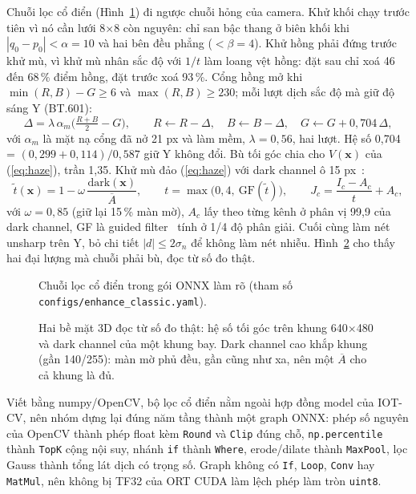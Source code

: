 Chuỗi lọc cổ điển (Hình~\ref{fig:classic}) đi ngược chuỗi hỏng của camera. Khử khối chạy trước tiên vì nó cần lưới 8$\times$8 còn nguyên: chỉ san bậc thang ở biên khối khi $|q_0-p_0|<\alpha=10$ và hai bên đều phẳng ($<\beta=4$). Khử hồng phải đứng trước khử mù, vì khử mù nhân sắc độ với $1/t$ làm loang vệt hồng: đặt sau chỉ xoá 46 đến 68\,\% điểm hồng, đặt trước xoá 93\,\%. Cổng hồng mở khi $\min(R,B)-G\geq6$ và $\max(R,B)\geq230$; mỗi lượt dịch sắc độ mà giữ độ sáng Y (BT.601):
\begin{equation}
\Delta=\lambda\,\alpha_m\Big(\tfrac{R+B}{2}-G\Big),\qquad R\leftarrow R-\Delta,\quad B\leftarrow B-\Delta,\quad G\leftarrow G+0{,}704\,\Delta,
\label{eq:magenta}
\end{equation}
với $\alpha_m$ là mặt nạ cổng đã nở 21 px và làm mềm, $\lambda=0{,}56$, hai lượt. Hệ số 0,704 = $(0{,}299+0{,}114)/0{,}587$ giữ Y không đổi. Bù tối góc chia cho $V(\mathbf{x})$ của (\ref{eq:haze}), trần 1,35. Khử mù đảo (\ref{eq:haze}) với dark channel ô 15 px~\cite{he-dcp}:
\begin{equation}
\tilde t(\mathbf{x}) = 1-\omega\,\frac{\mathrm{dark}(\mathbf{x})}{\overline{A}},\qquad t=\max\big(0{,}4,\ \mathrm{GF}(\tilde t)\big),\qquad J_c=\frac{I_c-A_c}{t}+A_c,
\label{eq:dehaze}
\end{equation}
với $\omega=0{,}85$ (giữ lại 15\,\% màn mờ), $A_c$ lấy theo từng kênh ở phân vị 99,9 của dark channel, GF là guided filter~\cite{guided} tính ở 1/4 độ phân giải. Cuối cùng làm nét unsharp trên Y, bỏ chi tiết $|d|\leq2\sigma_n$ để không làm nét nhiễu. Hình~\ref{fig:surf3d} cho thấy hai đại lượng mà chuỗi phải bù, đọc từ số đo thật.

\begin{figure}[!htbp]
\centering

\caption[Chuỗi lọc cổ điển trong gói ONNX làm rõ]{Chuỗi lọc cổ điển trong gói ONNX làm rõ (tham số \texttt{configs/enhance\_classic.yaml}).}
\label{fig:classic}
\end{figure}

\begin{figure}[!htbp]
\centering

\caption[Hai bề mặt 3D đọc từ số đo thật]{Hai bề mặt 3D đọc từ số đo thật: hệ số tối góc trên khung 640$\times$480 và dark channel của một khung bay. Dark channel cao khắp khung (gần 140/255): màn mờ phủ đều, gần cũng như xa, nên một $\overline{A}$ cho cả khung là đủ.}
\label{fig:surf3d}
\end{figure}

Viết bằng numpy/OpenCV, bộ lọc cổ điển nằm ngoài hợp đồng model của IOT-CV, nên nhóm dựng lại đúng năm tầng thành một graph ONNX: phép số nguyên của OpenCV thành phép float kèm \texttt{Round} và \texttt{Clip} đúng chỗ, \texttt{np.percentile} thành \texttt{TopK} cộng nội suy, nhánh \texttt{if} thành \texttt{Where}, erode/dilate thành \texttt{MaxPool}, lọc Gauss thành tổng lát dịch có trọng số. Graph không có \texttt{If}, \texttt{Loop}, \texttt{Conv} hay \texttt{MatMul}, nên không bị TF32 của ORT CUDA làm lệch phép làm tròn \texttt{uint8}.

